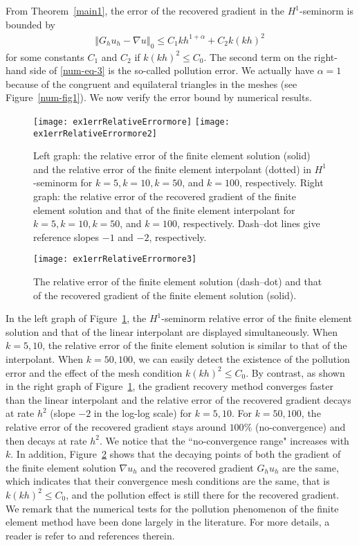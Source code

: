 \documentclass[leqno,final]{siamltex}
\numberwithin{equation}{section}
\newcommand{\norm}[1]{\left\Vert#1\right\Vert}
\newcommand{\al}{\alpha}
\newcommand{\na}{\nabla}
\newcommand{\eq}[1]{\begin{align}#1\end{align}}
\begin{document}
From Theorem~\ref{main1}, the error of the recovered {gradient in} the $H^1$-seminorm is bounded by
\eq{ \norm{G_hu_h-\na u}_0\leq C_1kh^{1+\al} + C_2k(kh)^2 \label{num-eq-3} }
for some constants $C_1$ and $C_2$ if $k(kh)^2\leq C_0$. The second {term} on the right-hand side of \eqref{num-eq-3} is the
so-called pollution error. We actually have
$\al=1$ because of the congruent and equilateral triangles in the meshes (see Figure~\ref{num-fig1}).
We now verify the error {bound by numerical} results.

\begin{figure}[htbp]
\begin{center}
\texttt{[image: ex1errRelativeErrormore]}
\texttt{[image: ex1errRelativeErrormore2]}
\caption{Left graph: the relative error of the finite element solution (solid) and the relative error of the finite element
interpolant (dotted) in $H^1$-seminorm for $k=5,k=10,k=50$, and $k=100$, respectively. Right graph: the relative error of the recovered gradient of
the finite element solution and that of the finite element interpolant for $k=5,k=10,k=50$, and $k=100$, respectively.
Dash--dot lines give reference slopes $-1$ and $-2$, respectively.  }
\label{num-fig2}
\end{center}
\end{figure}

\begin{figure}[htbp]
\begin{center}
\texttt{[image: ex1errRelativeErrormore3]}
\caption{The relative error of the finite element solution (dash--dot) and that of the recovered gradient of the finite element solution (solid).}\label{num-fig2a}
\end{center}
\end{figure}

In the left graph of Figure~\ref{num-fig2}, the $H^1$-seminorm relative error of the finite element solution
and that of the linear interpolant are displayed simultaneously.
When $k=5,10$, the relative error of the finite element solution is similar to that of
the interpolant. When $k=50,100$, we can easily detect
the existence of the pollution error and the effect of the mesh condition $k(kh)^2\leq C_0$.
By contrast, as shown in the right graph of Figure~\ref{num-fig2}, the gradient recovery method converges faster than the linear interpolant and the relative error of the recovered gradient decays at rate $h^2$ (slope $-2$ in the log-log scale)
 for $k=5, 10$. For $k=50, 100$, the relative error of the recovered gradient
stays around $100\%$ (no-convergence) and then decays at rate $h^2$. We notice that the ``no-convergence range" increases with $k$. In addition, Figure~\ref{num-fig2a} shows that the decaying points of both the gradient of the finite element solution $\na u_h$ and the recovered gradient $G_hu_h$ are the same, which indicates that their convergence mesh conditions are the same, that is $k(kh)^2\leq C_0$, and
the pollution effect is still there for the recovered gradient. We remark that the numerical tests for the pollution phenomenon of the finite element method have been done largely in the literature.
For more details, a reader is refer to \cite{dw} and references therein.
\end{document}
